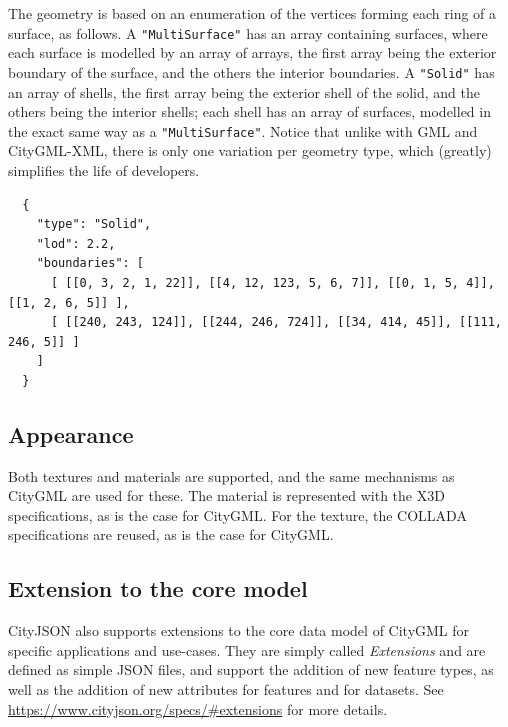 The geometry is based on an enumeration of the vertices forming each ring of a surface, as follows.
A \texttt{"MultiSurface"} has an array containing surfaces, where each surface is modelled by an array of arrays, the first array being the exterior boundary of the surface, and the others the interior boundaries.
A \texttt{"Solid"} has an array of shells, the first array being the exterior shell of the solid, and the others being the interior shells; each shell has an array of surfaces, modelled in the exact same way as a \texttt{"MultiSurface"}.
Notice that unlike with GML and CityGML-XML, there is only one variation per geometry type, which (greatly) simplifies the life of developers.
\begin{lstlisting}
  {
    "type": "Solid",
    "lod": 2.2,
    "boundaries": [
      [ [[0, 3, 2, 1, 22]], [[4, 12, 123, 5, 6, 7]], [[0, 1, 5, 4]], [[1, 2, 6, 5]] ], 
      [ [[240, 243, 124]], [[244, 246, 724]], [[34, 414, 45]], [[111, 246, 5]] ] 
    ]
  }
\end{lstlisting}


\subsection{Appearance}

Both textures and materials are supported, and the same mechanisms as CityGML are used for these. 
The material is represented with the X3D specifications, as is the case for CityGML\@. 
For the texture, the COLLADA specifications are reused, as is the case for CityGML\@.


\subsection{Extension to the core model}

CityJSON also supports extensions to the core data model of CityGML for specific applications and use-cases.
They are simply called \emph{Extensions} and are defined as simple JSON files, and support the addition of new feature types, as well as the addition of new attributes for features and for datasets. 
See \url{https://www.cityjson.org/specs/#extensions} for more details.



